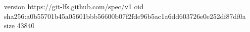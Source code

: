 version https://git-lfs.github.com/spec/v1
oid sha256:a0b55701b45a05601bbb56600b07f2fde96b5ac1a6dd603726e0e252df87df0a
size 43840
